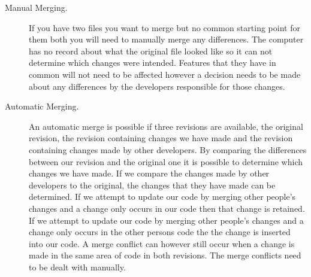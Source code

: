 \begin{description}
  \item [Manual Merging.]
If you have two files you want to merge but no common starting point for them both you will need to manually merge any differences.
The computer has no record about what the original file looked like so it can not determine which changes were intended.
Features that they have in common will not need to be affected however a decision needs to be made about any differences by the developers responsible for those changes.

  \item [Automatic Merging.] 
An automatic merge is possible if three revisions are available, the original revision, the revision containing changes we have made and the revision containing changes made by other developers. 
By comparing the differences between our revision and the original one it is possible to determine which changes we have made.  
If we compare the changes made by other developers to the original, the changes that they have made can be determined.  
If we attempt to update our code by merging other people's changes and a change only occurs in our code then that change is retained. 
If we attempt to update our code by merging other people's changes and a change only occurs in the other persons code the the change is inserted into our code.
A merge conflict can however still occur when a change is made in the same area of code in both revisions.
The merge conflicts need to be dealt with manually.


% 
\end{description}
 

